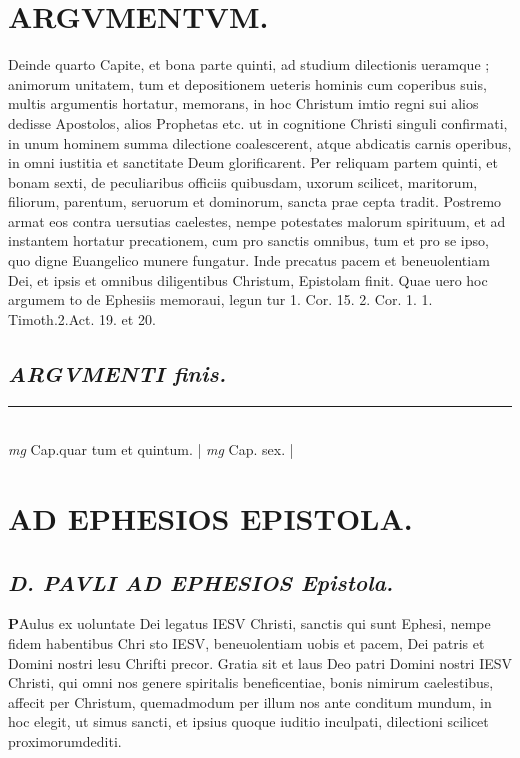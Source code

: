 \documentclass{article}
\begin{document}
\begin{pages}
\section*{ARGVMENTVM.  }\pstart Deinde quarto Capite, et bona parte quinti, ad studium dilectionis ueramque ; animorum unitatem, tum et depositionem ueteris hominis cum coperibus suis, multis argumentis hortatur, memorans, in hoc Christum imtio regni sui alios dedisse Apostolos, alios Prophetas etc. ut in cognitione Christi singuli confirmati, in unum hominem summa dilectione coalescerent, atque  abdicatis carnis operibus, in omni iustitia et sanctitate Deum glorificarent.  Per reliquam partem quinti, et bonam sexti, de peculiaribus officiis quibusdam, uxorum scilicet, maritorum, filiorum, parentum, seruorum et dominorum, sancta prae cepta tradit.  Postremo armat eos contra uersutias caelestes, nempe potestates malorum spirituum, et ad instantem hortatur precationem, cum pro sanctis omnibus, tum et pro se ipso, quo digne Euangelico munere fungatur.  Inde precatus pacem et beneuolentiam Dei, et ipsis et omnibus diligentibus Christum, Epistolam finit. Quae uero hoc argumem to de Ephesiis memoraui, legun tur 1. Cor. 15.  2. Cor. 1.  1. Timoth.2.Act. 19. et 20.  \pend
{}
{}
\subsection*{\textit{ARGVMENTI finis.  }}
\vspace{0.5cm}\noindent
\vspace{0.2cm}\rule{1cm}{0.2pt}\\ 
\hspace{0.2cm}\textit{mg}
\footnotesize Cap.quar tum et quintum.  
\normalsize| 
\hspace{0.2cm}\textit{mg}
\footnotesize Cap.  sex.  
\normalsize| 
\section*{AD EPHESIOS EPISTOLA. }
\marginpar{[ p.9 ]}
\marginpar{[ p.1.  ]}
\marginpar{[ p.2.  ]}
\marginpar{[ p.B ]}
{}
\subsection*{\textit{D. PAVLI AD EPHESIOS Epistola.  }}\pstart \huge\textbf{P}\normalsize Aulus ex uoluntate Dei legatus IESV Christi, sanctis qui sunt Ephesi, nempe fidem habentibus Chri sto IESV, beneuolentiam uobis et pacem, Dei patris et Domini nostri lesu Chrifti precor.  \pend\pstart Gratia sit et laus Deo patri Domini nostri IESV Christi, qui omni nos genere spiritalis beneficentiae, bonis nimirum caelestibus, affecit per Christum, quemadmodum per illum nos ante conditum mundum, in hoc elegit, ut simus sancti, et ipsius quoque  iuditio inculpati, dilectioni scilicet proximorumdediti.  \pend

\end{pages}
\end{document}

